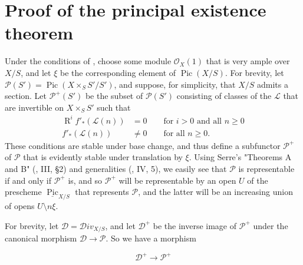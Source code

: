 \section{Proof of the principal existence theorem}\label{fga3.v-5}


Under the conditions of , choose some module $\mathcal{O}_X(1)$ that is very ample over $X/S$, and let $\xi$ be the corresponding element of $\operatorname{Pic}(X/S)$.
For brevity, let $\mathcal{P}(S')=\operatorname{Pic}(X\times_S S'/S')$, and suppose, for simplicity, that $X/S$ admits a section.
Let $\mathcal{P}^+(S')$ be the subset of $\mathcal{P}(S')$ consisting of classes of the $\mathcal{L}$ that are invertible on $X\times_S S'$ such that
\[
    \begin{aligned}
        \operatorname{R}^i f'_*(\mathcal{L}(n)) & = 0
        \qquad\text{for }i>0\text{ and all }n\geqslant0
        \\f'_*(\mathcal{L}(n)) &\neq0
        \qquad\text{for all }n\geqslant0.
    \end{aligned}
\]
These conditions are stable under base change, and thus define a subfunctor $\mathcal{P}^+$ of $\mathcal{P}$ that is evidently stable under translation by $\xi$.
Using Serre's "Theorems A and B" (\cite{GD1960}, III, §2) and generalities (\cite{Gro1960a}, IV, 5), we easily see that $\mathcal{P}$ is representable if and only if $\mathcal{P}^+$ is, and so $\mathcal{P}^+$ will be representable by an open $U$ of the prescheme $\underline{\operatorname{Pic}}_{X/S}$ that represents $\mathcal{P}$, and the latter will be an increasing union of opens $U\setminus n\xi$.

For brevity, let $\mathcal{D}=\mathcal{D}iv_{X/S}$, and let $\mathcal{D}^+$ be the inverse image of $\mathcal{P}^+$ under the canonical morphism $\mathcal{D}\to\mathcal{P}$.
So we have a morphism

\begin{equation}\tag{+}\label{fga3.v-5-equation-plus}
    \mathcal{D}^+\to \mathcal{P}^+
\end{equation}

